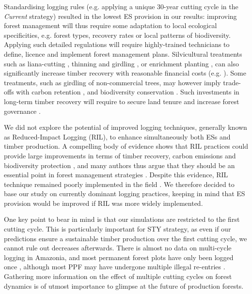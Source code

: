 \documentclass{article}
\begin{document}
Standardising logging rules (e.g. applying a unique 30-year cutting cycle in the \textit{Current} strategy) resulted in the lowest ES provision in our results: improving forest management will thus require some adaptation to local ecological specificities, e.g. forest types, recovery rates or local patterns of biodiversity. Applying such detailed regulations will require highly-trained technicians to define, licence and implement forest management plans. Silvicultural treatments such as liana-cutting \cite{Mills2019}, thinning and girdling \cite{Pena-Claros2008}, or enrichment planting \cite{Schwartz2013,Navarro-Cerrillo2011}, can also significantly increase timber recovery with reasonable financial costs (e.g. \cite{Mills2019}). Some treatments, such as  girdling of non-commercial trees, may however imply trade-offs with carbon retention \cite{Roopsind2018}, and biodiversity conservation \cite{Ruslandi2017}. Such investments in long-term timber recovery will require to secure land tenure and increase forest governance \cite{Smith2006}. 

We did not explore the potential of improved logging techniques, generally known as Reduced-Impact Logging (RIL), to enhance simultaneously both ESs and timber production. A compelling body of evidence shows that RIL practices could provide large improvements in terms of timber recovery, carbon emissions and biodiversity protection \cite{Griscom2019,Putz2008c,Tobler2018,West2014}, and many authors thus argue that they should be an essential point in forest management strategies \cite{Griscom2018,Runting2018}. Despite this evidence, RIL technique remained poorly implemented in the field \cite{Ellis2019}. We therefore decided to base our study on currently dominant logging practices, keeping in mind that ES provision would be improved if RIL was more widely implemented.

One key point to bear in mind is that our simulations are restricted to the first cutting cycle. This is particularly important for STY strategy, as even if our predictions ensure a sustainable timber production over the first cutting cycle, we cannot rule out decreases afterwards. There is almost no data on multi-cycle logging in Amazonia, and most permanent forest plots have only been logged once \cite{Sist2015}, although most PPF may have undergone multiple illegal re-entries \cite{Tritsch2016a}. Gathering more information on the effect of multiple  cutting cycles on forest dynamics is of utmost importance to glimpse at the future of production forests.
\end{document}
